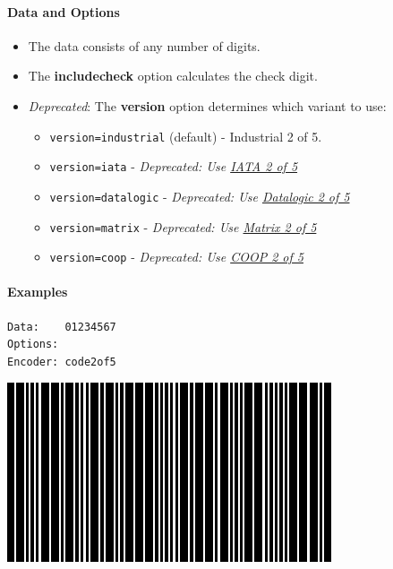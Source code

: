 \hypertarget{data-and-options-65}{%
\paragraph{Data and Options}\label{data-and-options-65}}

\begin{itemize}
\tightlist
\item
  The data consists of any number of digits.
\item
  The \textbf{includecheck} option calculates the check digit.
\item
  \emph{Deprecated}: The \textbf{version} option determines which
  variant to use:

  \begin{itemize}
  \tightlist
  \item
    \texttt{version=industrial} (default) - Industrial 2 of 5.
  \item
    \texttt{version=iata} - \emph{Deprecated: Use
    \protect\hyperlink{iata-2-of-5}{IATA 2 of 5}}
  \item
    \texttt{version=datalogic} - \emph{Deprecated: Use
    \protect\hyperlink{datalogic-2-of-5}{Datalogic 2 of 5}}
  \item
    \texttt{version=matrix} - \emph{Deprecated: Use
    \protect\hyperlink{matrix-2-of-5}{Matrix 2 of 5}}
  \item
    \texttt{version=coop} - \emph{Deprecated: Use
    \protect\hyperlink{coop-2-of-5}{COOP 2 of 5}}
  \end{itemize}
\end{itemize}

\hypertarget{examples-42}{%
\paragraph{Examples}\label{examples-42}}

\begin{verbatim}
Data:    01234567
Options: 
Encoder: code2of5
\end{verbatim}

\includegraphics{images/code25-1.eps}


